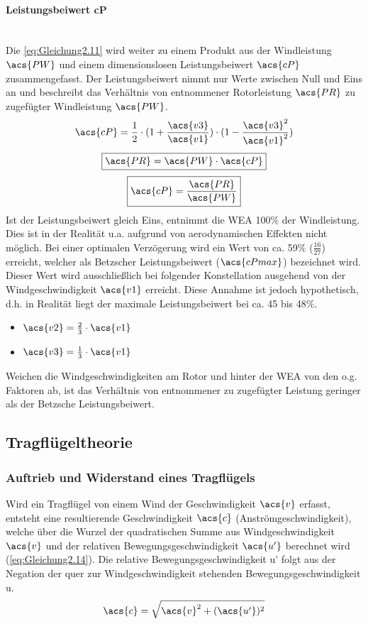 \paragraph{Leistungsbeiwert \acs{cP}}\mbox{}\smallskip\\
Die \autoref{eq:Gleichung2.11} wird weiter zu einem Produkt aus der Windleistung $\acs{PW}$ und einem dimensionslosen Leistungsbeiwert $\acs{cP}$ zusammengefasst. Der Leistungsbeiwert nimmt nur Werte zwischen Null und Eins an und beschreibt das Verhältnis von entnommener Rotorleistung $\acs{PR}$ zu zugefügter Windleistung $\acs{PW}$.
\begin{align*}
    \acs{cP} = \frac{1}{2} \cdot (1 + \frac{\acs{v3}}{\acs{v1}}) \cdot (1 - \frac{\acs{v3}^2}{\acs{v1}^2})
\end{align*}
\begin{equation}\label{eq:Gleichung2.12}
    \boxed{\acs{PR} = \acs{PW} \cdot \acs{cP}}
\end{equation}
\begin{equation}\label{eq:Gleichung2.13}
    \boxed{\acs{cP} = \frac{\acs{PR}}{\acs{PW}}}
\end{equation}
Ist der Leistungsbeiwert gleich Eins, entnimmt die WEA 100\% der Windleistung. Dies ist in der Realität u.a. aufgrund von aerodynamischen Effekten nicht möglich. Bei einer optimalen Verzögerung wird ein Wert von ca. 59\% ($\frac{16}{27}$) erreicht, welcher als Betzscher Leistungsbeiwert ($\acs{cPmax}$) bezeichnet wird. Dieser Wert wird ausschließlich bei folgender Konstellation ausgehend von der Windgeschwindigkeit $\acs{v1}$ erreicht. Diese Annahme ist jedoch hypothetisch, d.h. in Realität liegt der maximale Leistungsbeiwert bei ca. 45 bis 48\%.
\begin{itemize}
    \item $\acs{v2} = \frac{2}{3} \cdot \acs{v1}$
    \item $\acs{v3} = \frac{1}{3} \cdot \acs{v1}$
\end{itemize}
Weichen die Windgeschwindigkeiten am Rotor und hinter der WEA von den o.g. Faktoren ab, ist das Verhältnis von entnommener zu zugefügter Leistung geringer als der Betzsche Leistungsbeiwert.

\subsection{Tragflügeltheorie}

\subsubsection{Auftrieb und Widerstand eines Tragflügels}
Wird ein Tragflügel von einem Wind der Geschwindigkeit $\acs{v}$ erfasst, entsteht eine resultierende Geschwindigkeit $\acs{c}$ (Anströmgeschwindigkeit), welche über die Wurzel der quadratischen Summe aus Windgeschwindigkeit $\acs{v}$ und der relativen Bewegungsgeschwindigkeit $\acs{u'}$ berechnet wird (\autoref{eq:Gleichung2.14}). Die relative Bewegungsgeschwindigkeit \acs{u'} folgt aus der Negation der quer zur Windgeschwindigkeit stehenden Bewegungsgeschwindigkeit \acs{u}.
\begin{align} \label{eq:Gleichung2.14}
    \acs{c} = \sqrt{\acs{v}^2 + (\acs{u'})^2}
\end{align}

